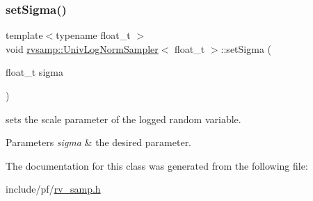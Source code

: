 \subsubsection{\texorpdfstring{set\+Sigma()}{setSigma()}}
{\footnotesize\ttfamily template$<$typename float\+\_\+t $>$ \\
void \hyperlink{classrvsamp_1_1UnivLogNormSampler}{rvsamp\+::\+Univ\+Log\+Norm\+Sampler}$<$ float\+\_\+t $>$\+::set\+Sigma (\begin{DoxyParamCaption}\item[{float\+\_\+t}]{sigma }\end{DoxyParamCaption})}



sets the scale parameter of the logged random variable. 


\begin{DoxyParams}{Parameters}
{\em sigma} & the desired parameter. \\
\hline
\end{DoxyParams}


The documentation for this class was generated from the following file\+:\begin{DoxyCompactItemize}
\item 
include/pf/\hyperlink{rv__samp_8h}{rv\+\_\+samp.\+h}\end{DoxyCompactItemize}
